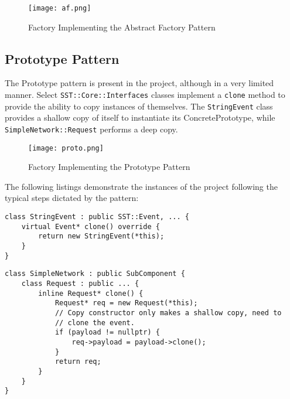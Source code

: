 \begin{figure}[h]
    \caption{Factory Implementing the Abstract Factory Pattern}
    \centering
    \texttt{[image: af.png]}
\end{figure}




\subsection{Prototype Pattern}
The Prototype pattern is present in the project, although in a very limited manner. Select \texttt{SST::Core::Interfaces} classes implement a \texttt{clone} method to provide the ability to copy instances of themselves. The \texttt{StringEvent} class provides a shallow copy of itself to instantiate its ConcretePrototype, while \texttt{SimpleNetwork::Request} performs a deep copy.

\begin{figure}[h]
    \caption{Factory Implementing the Prototype Pattern}
    \centering
    \texttt{[image: proto.png]}
\end{figure}

The following listings demonstrate the instances of the project following the typical steps dictated by the pattern:

\begin{lstlisting}[style=customC++,label=prototype1,caption=StringEvent Implementing the Prototype Pattern \\ File: src/sst/core/interfaces/stringEvent.h]
class StringEvent : public SST::Event, ... {
    virtual Event* clone() override {
        return new StringEvent(*this);
    }
}
\end{lstlisting}

\begin{lstlisting}[style=customC++,label=prototype2,caption=SimpleNetwork::Request Implementing the Prototype Pattern \\ File: src/sst/core/interfaces/simpleNetwork.h]
class SimpleNetwork : public SubComponent {
    class Request : public ... {
        inline Request* clone() {
            Request* req = new Request(*this);
            // Copy constructor only makes a shallow copy, need to
            // clone the event.
            if (payload != nullptr) {
                req->payload = payload->clone();
            }
            return req;
        }
    }
}
\end{lstlisting}
